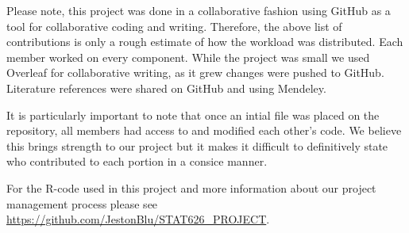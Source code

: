 \documentclass[twoside,twocolumn]{article}
\begin{document}
Please note, this project was done in a collaborative fashion using GitHub as a tool for collaborative coding and writing. Therefore, the above list of contributions is only a rough estimate of how the workload was distributed. Each member worked on every component.  While the project was small we used Overleaf for collaborative writing, as it grew changes were pushed to GitHub.  Literature references were shared on GitHub and using Mendeley.  

It is particularly important to note that once an intial file was placed on the repository, all members had access to and modified each other's code. We believe this brings strength to our project but it makes it difficult to definitively state who contributed to each portion in a consice manner.

For  the R-code used in this project and more information about our project management process please see \url{https://github.com/JestonBlu/STAT626_PROJECT}.
\end{document}
